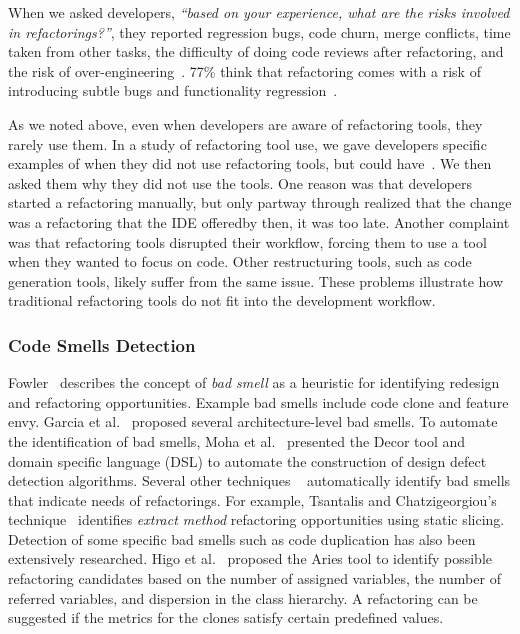 \documentclass[runningheads,a4paper]{llncs}
\begin{document}
When we asked developers, {\it ``based on your experience, what are the risks involved in refactorings?''}, they reported regression bugs, code churn, merge conflicts, time taken from other tasks, the difficulty of doing code reviews after refactoring, and the risk of over-engineering~\cite{Kim2012:fieldrefactoring}. 77\% think that refactoring comes with a risk of introducing subtle bugs and functionality regression~\cite{Kim2012:fieldrefactoring}.

As we noted above, even when developers are aware of refactoring tools, they rarely use them.  In a study of refactoring tool use, we gave developers specific examples of when they did not use refactoring tools, but could have~\cite{murphyHill10a}.  We then asked them why they did not use the tools.  One reason was that developers started a refactoring manually, but only partway through realized that the change was a refactoring that the IDE offered\textemdash by then, it was too late.  Another complaint was that refactoring tools disrupted their workflow, forcing them to use a tool when they wanted to focus on code.  Other restructuring tools, such as code generation tools, likely suffer from the same issue.  These problems illustrate how traditional refactoring tools do not fit into the development workflow.

\subsubsection{Code Smells Detection} 

Fowler~\cite{fowler:refactor99} describes the concept of {\em bad smell} as a heuristic for identifying redesign and refactoring opportunities. Example bad smells include code clone and feature envy. Garcia et al.~\cite{garcia:csmr09} proposed several architecture-level bad smells. To automate the identification of bad smells, Moha et al.~\cite{moha:fase08} presented the Decor tool and domain specific language (DSL) to automate the construction of design defect detection algorithms.  Several other techniques ~\cite{tsantalis:csmr09, tsantalis:tse09, tsantalis:csmr08} automatically identify bad smells that indicate needs of refactorings. For example, Tsantalis and Chatzigeorgiou's technique~\cite{tsantalis:csmr09} identifies {\em extract method} refactoring opportunities using static slicing. Detection of some specific bad smells such as code duplication has also been extensively researched. Higo et al.~\cite{higo:profes04} proposed the Aries tool to identify possible refactoring candidates based on the number of assigned variables, the number of referred variables, and dispersion in the class hierarchy. A refactoring can be suggested if the metrics for the clones satisfy certain predefined values.
\end{document}

